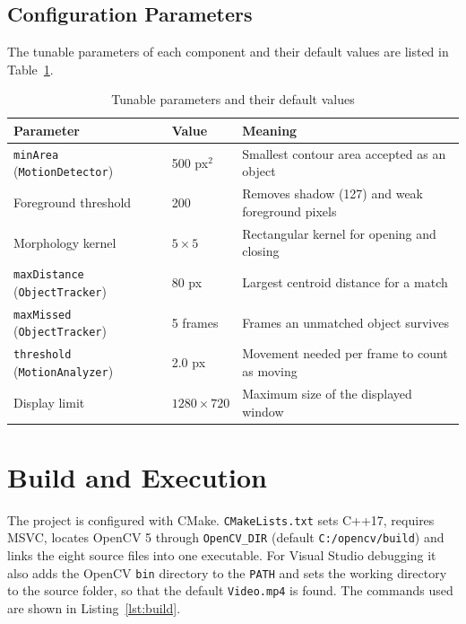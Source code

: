 \documentclass[12pt,a4paper,oneside]{book}
\begin{document}
\subsection{Configuration Parameters}
The tunable parameters of each component and their default values are listed in Table~\ref{tab:params}.

\begin{table}[H]
\centering

\small
\begin{tabular}{@{}p{4.1cm}p{2.4cm}p{8.5cm}@{}}
\toprule
\textbf{Parameter} & \textbf{Value} & \textbf{Meaning}\\
\midrule
\texttt{minArea} (\texttt{MotionDetector}) & 500 px$^2$ & Smallest contour area accepted as an object\\
Foreground threshold & 200 & Removes shadow (127) and weak foreground pixels\\
Morphology kernel & $5\times5$ & Rectangular kernel for opening and closing\\
\texttt{maxDistance} (\texttt{ObjectTracker}) & 80 px & Largest centroid distance for a match\\
\texttt{maxMissed} (\texttt{ObjectTracker}) & 5 frames & Frames an unmatched object survives\\
\texttt{threshold} (\texttt{MotionAnalyzer}) & 2.0 px & Movement needed per frame to count as moving\\
Display limit & $1280\times720$ & Maximum size of the displayed window\\
\bottomrule
\end{tabular}
\caption{Tunable parameters and their default values}
\label{tab:params}
\end{table}

\section{Build and Execution}
The project is configured with CMake. \texttt{CMakeLists.txt} sets C++17, requires MSVC, locates OpenCV 5 through \texttt{OpenCV\_DIR} (default \texttt{C:/opencv/build}) and links the eight source files into one executable. For Visual Studio debugging it also adds the OpenCV \texttt{bin} directory to the \texttt{PATH} and sets the working directory to the source folder, so that the default \texttt{Video.mp4} is found. The commands used are shown in Listing~\ref{lst:build}.
\end{document}

